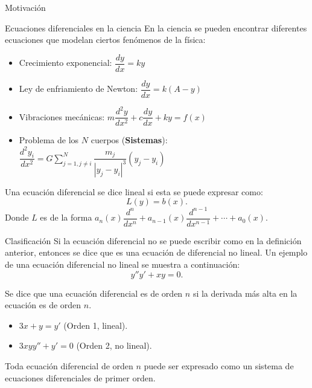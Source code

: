 \begin{frame}{Motivación}
\small
\begin{block}{Ecuaciones diferenciales en la ciencia}
En la ciencia se pueden encontrar diferentes ecuaciones que modelan ciertos fenómenos de la física:\pause
\begin{itemize}
\item Crecimiento exponencial: \textbf{$\dfrac{dy}{dx}=ky$}
\item Ley de enfriamiento de Newton: \textbf{$\dfrac{dy}{dx}=k(A-y)$}
\item Vibraciones mecánicas: \textbf{$m\dfrac{d^2y}{dx^2}+c\dfrac{dy}{dx}
+ky=f(x)$}
\item Problema de los $N$ cuerpos (\textbf{Sistemas}): \textbf{$\dfrac{d^2y_i}{dx^2}=G\sum_{j=1,j\neq i}^{N}\dfrac{m_j}{|y_j-y_i|^3}(y_j-y_i)$}
\end{itemize}
\end{block}\pause
\begin{Def}
Una ecuación diferencial se dice lineal si esta se puede expresar como:
$$L(y)=b(x).$$
Donde $L$ es de la forma $a_n(x)\dfrac{d^n}{dx^n}+a_{n-1}(x)\dfrac{d^{n-1}}{dx^{n-1}}+\cdots+a_0(x).$
\end{Def}
\end{frame}
\begin{frame}{Clasificación}
Si la ecuación diferencial no se puede escribir como en la definición anterior, entonces se dice que es una ecuación de diferencial no lineal. Un ejemplo de una ecuación diferencial no lineal se muestra a continuación:
$$y''y'+xy=0.$$
\begin{Def}[Orden]
Se dice que una ecuación diferencial es de orden $n$ si la derivada más alta en la ecuación es de orden $n$.
\end{Def}\pause
\begin{itemize}
\item $3x+y=y'$ (Orden 1, lineal).
\item $3xyy''+y'=0$ (Orden 2, no lineal).
\end{itemize}
\begin{Prop}
Toda ecuación diferencial de orden $n$ puede ser expresado como un sistema de ecuaciones diferenciales de primer orden. 
\end{Prop}
\end{frame}
